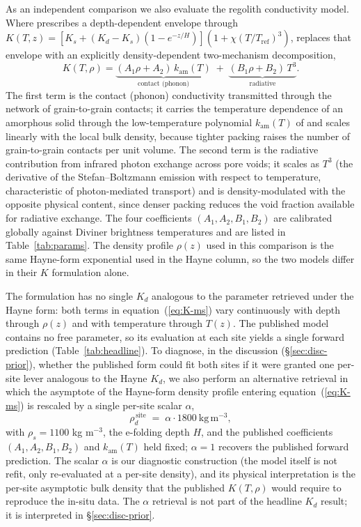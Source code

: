 \documentclass[11pt]{article}
\begin{document}
As an independent comparison we also evaluate the \citet{martinez2021}
regolith conductivity model. Where \citet{hayne2017} prescribes a
depth-dependent envelope through
$K(T,z)=[K_s+(K_d-K_s)(1-e^{-z/H})](1+\chi(T/T_\mathrm{ref})^3)$,
\citet{martinez2021} replaces that envelope with an explicitly
density-dependent two-mechanism decomposition,
\begin{equation}
K(T,\rho) = \underbrace{(A_1\rho + A_2)\,k_\mathrm{am}(T)}_{\text{contact (phonon)}}
          \;+\; \underbrace{(B_1\rho + B_2)\,T^3}_{\text{radiative}}.
\label{eq:K-ms}
\end{equation}
The first term is the contact (phonon) conductivity transmitted through the
network of grain-to-grain contacts; it carries the temperature dependence
of an amorphous solid through the low-temperature polynomial
$k_\mathrm{am}(T)$ of \citet{martinez2021} and scales linearly with the
local bulk density, because tighter packing raises the number of grain-to-grain
contacts per unit volume. The second term is the
radiative contribution from infrared photon exchange across pore voids; it
scales as $T^3$ (the derivative of the Stefan--Boltzmann emission with
respect to temperature, characteristic of photon-mediated transport) and is
density-modulated with the opposite physical content, since denser packing
reduces the void fraction available for radiative exchange. The four
coefficients $(A_1,A_2,B_1,B_2)$ are calibrated globally against Diviner
brightness temperatures and are listed in Table~\ref{tab:params}. The
density profile $\rho(z)$ used in this comparison is the same Hayne-form
exponential used in the Hayne column, so the two models differ in their $K$
formulation alone.

The \citet{martinez2021} formulation has no single $K_d$ analogous to the
parameter retrieved under the Hayne form: both terms in
equation~(\ref{eq:K-ms}) vary continuously with depth through $\rho(z)$ and
with temperature through $T(z)$. The published model contains no free
parameter, so its evaluation at each site yields a single forward
prediction (Table~\ref{tab:headline}). To diagnose, in the discussion
(\S\ref{sec:disc-prior}), whether the published \citet{martinez2021} form
could fit both sites if it were granted one per-site lever analogous to the
Hayne $K_d$, we also perform an alternative retrieval in which the
asymptote of the Hayne-form density profile entering
equation~(\ref{eq:K-ms}) is rescaled by a single per-site scalar $\alpha$,
\begin{equation}
\rho_d^{\,\text{site}} \;=\; \alpha\cdot 1800\ \mathrm{kg\,m^{-3}},
\label{eq:alpha}
\end{equation}
with $\rho_s=1100$ kg m$^{-3}$, the e-folding depth $H$, and the published
coefficients $(A_1,A_2,B_1,B_2)$ and $k_\mathrm{am}(T)$ held fixed;
$\alpha=1$ recovers the published forward prediction. The scalar $\alpha$
is our diagnostic construction (the \citet{martinez2021} model itself is
not refit, only re-evaluated at a per-site density), and its physical
interpretation is the per-site asymptotic bulk density that
the published $K(T,\rho)$ would require to reproduce the in-situ data. The
$\alpha$ retrieval is not part of the headline $K_d$ result; it is
interpreted in \S\ref{sec:disc-prior}.
\end{document}
